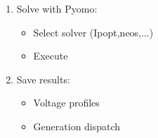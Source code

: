 \documentclass[
	11pt, %
	aspectratio=169, %
]{beamer}
\begin{document}
\begin{frame}
\begin{algorithm}[H]
\begin{columns}[T]
\begin{column}{0.48\textwidth}
\begin{enumerate}
			\item Solve with Pyomo:
			\begin{itemize}
				\item Select solver (Ipopt,neos,...)
				\item Execute
			\end{itemize}

			\item Save results:
			\begin{itemize}
				\item Voltage profiles
				\item Generation dispatch
			\end{itemize}
		\end{enumerate}
		\end{column}
	\end{columns}
	
	\end{algorithm}
	

\end{frame}

\end{document}
